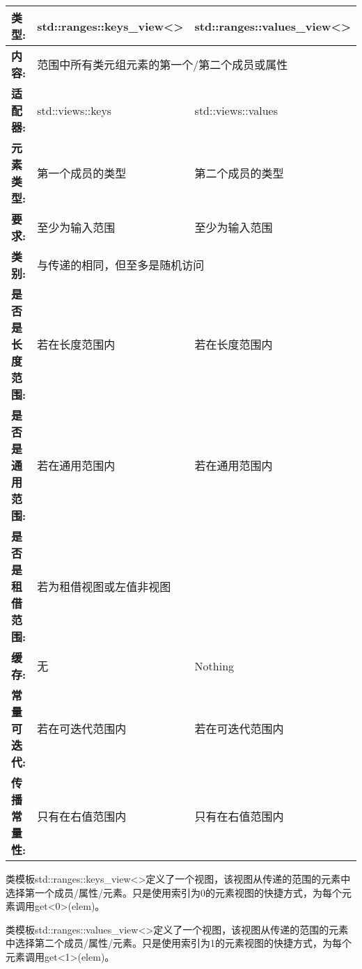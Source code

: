 	

\begin{longtable}[c]{|l|ll|}
\hline
\textbf{类型:}    & \multicolumn{1}{l|}{std::ranges::keys\_view\textless{}\textgreater{}} & std::ranges::values\_view\textless{}\textgreater{} \\ \hline
\endfirsthead
%
\endhead
%
\textbf{内容:} & \multicolumn{2}{l|}{范围中所有类元组元素的第一个/第二个成员或属性}                            \\ \hline
\textbf{适配器:}              & \multicolumn{1}{l|}{std::views::keys}           & std::views::values         \\ \hline
\textbf{元素类型:}         & \multicolumn{1}{l|}{第一个成员的类型}   & 第二个成员的类型  \\ \hline
\textbf{要求:}             & \multicolumn{1}{l|}{至少为输入范围}       & 至少为输入范围       \\ \hline
\textbf{类别:}             & \multicolumn{2}{l|}{与传递的相同，但至多是随机访问}                \\ \hline
\textbf{是否是长度范围:}       & \multicolumn{1}{l|}{若在长度范围内}          & 若在长度范围内          \\ \hline
\textbf{是否是通用范围:}      & \multicolumn{1}{l|}{若在通用范围内}         & 若在通用范围内         \\ \hline
\textbf{是否是租借范围:}    & \multicolumn{2}{l|}{若为租借视图或左值非视图}               \\ \hline
\textbf{缓存:}               & \multicolumn{1}{l|}{无}                    & Nothing                    \\ \hline
\textbf{常量可迭代:}       & \multicolumn{1}{l|}{若在可迭代范围内} & 若在可迭代范围内 \\ \hline
\textbf{传播常量性:} & \multicolumn{1}{l|}{只有在右值范围内}    & 只有在右值范围内    \\ \hline
\end{longtable}

类模板std::ranges::keys\_view<>定义了一个视图，该视图从传递的范围的元素中选择第一个成员/属性/元素。只是使用索引为0的元素视图的快捷方式，为每个元素调用get<0>(elem)。

类模板std::ranges::values\_view<>定义了一个视图，该视图从传递的范围的元素中选择第二个成员/属性/元素。只是使用索引为1的元素视图的快捷方式，为每个元素调用get<1>(elem)。

